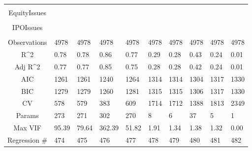 \documentclass{article}
\begin{document}
\begin{table}[H]
\begin{tabular}{|clllllllll|}
   &  &  &  &  &  &  &  &  &  \\ 
  EquityIssues &  &  &  &  &  &  &  &  &  \\ 
   &  &  &  &  &  &  &  &  &  \\ 
  IPOIssues &  &  &  &  &  &  &  &  &  \\ 
   &  &  &  &  &  &  &  &  &  \\ 
  \hline 
 Observations & 4978 & 4978 & 4978 & 4978 & 4978 & 4978 & 4978 & 4978 & 4978 \\ 
  R^2 & 0.78 & 0.78 & 0.86 & 0.77 & 0.29 & 0.28 & 0.43 & 0.24 & 0.01 \\ 
  Adj R^2 & 0.77 & 0.77 & 0.85 & 0.75 & 0.28 & 0.28 & 0.42 & 0.24 & 0.01 \\ 
  AIC & 1261 & 1261 & 1240 & 1264 & 1314 & 1314 & 1304 & 1317 & 1330 \\ 
  BIC & 1279 & 1279 & 1260 & 1281 & 1315 & 1315 & 1306 & 1317 & 1330 \\ 
  CV & 578 & 579 & 383 & 609 & 1714 & 1712 & 1388 & 1813 & 2349 \\ 
  Params & 273 & 271 & 302 & 270 & 8 & 6 & 37 & 5 & 1 \\ 
  Max VIF & 95.39 & 79.64 & 362.39 & 51.82 & 1.91 & 1.34 & 1.38 & 1.32 & 0.00 \\ 
  Regression \# & 474 & 475 & 476 & 477 & 478 & 479 & 480 & 481 & 482 \\ 
   \hline
\end{tabular}
 
\end{table}
\end{document}

